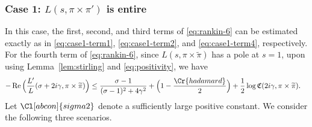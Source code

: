 \documentclass[12pt,reqno]{amsart}
\renewcommand{\tilde}{\widetilde}
\theoremstyle{remark}
\renewcommand{\tilde}{\widetilde}
\DeclareMathOperator{\Real}{Re}
\renewcommand{\tilde}{\widetilde}
\numberwithin{equation}{section}
\begin{document}
    \subsubsection{Case 1:  \texorpdfstring{$L(s,\pi\times \pi')$}{en} is entire}\label{subsubsec:entire}
	In this case, the first, second, and third terms of \eqref{eq:rankin-6} can be estimated exactly as in \eqref{eq:case1-term1}, \eqref{eq:case1-term2}, and \eqref{eq:case1-term4}, respectively.  
	For the fourth term of \eqref{eq:rankin-6}, since $L(s, \pi \times \tilde{\pi})$ has a pole at $s=1$, upon using Lemma~\ref{lem:stirling} and \eqref{eq:positivity}, we have
	\begin{equation}\label{eq:case3-term3}
		\begin{aligned}
			-\Real\Big(\frac{L'}{L}(\sigma + 2i\gamma, \pi \times \tilde{\pi}) \Big) 
			&\le \frac{\sigma-1}{(\sigma-1)^2+4\gamma^2} + \Big(1-\frac{\Cr{hadamard}}{2}\Big)+ \frac{1}{2}\log \mathfrak{C}(2i\gamma, \pi \times \tilde{\pi}).
		\end{aligned}
	\end{equation}
    Let $\Cl[abcon]{sigma2}$ denote a sufficiently large positive constant. %
    We consider the following three scenarios. %
\end{document}
